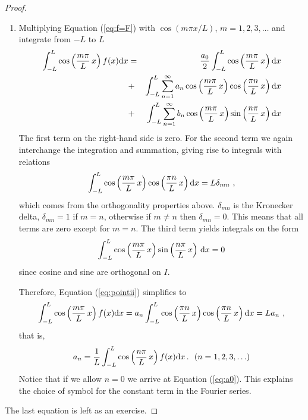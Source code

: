 \begin{proof}
\begin{enumerate}
	\item  Multiplying Equation (\ref{eq:f=F}) with $\cos(m \pi x/L)$, $m=1,2,3, \ldots$ and integrate from $-L$ to $L$
		\begin{eqnarray}
			\int_{-L}^{L}\cos\left(\frac{m\pi }{L} \, x\right) f(x)\mathrm{d} x &=&
				 \frac{a_0}{2} \int_{-L}^L \cos\left(\frac{m\pi }{L} \, x\right) \mathrm{d} x 
				 \nonumber \\
				 &+& \int_{-L}^L \sum_{n=1}^\infty a_n\cos\left(\frac{m\pi }{L} \, x\right) 
				 \cos\left(\frac{\pi n}{L} \, x\right) \mathrm{d} x 
				\nonumber \\
				&+& \int_{-L}^L \sum_{n=1}^\infty b_n \cos\left(\frac{m\pi }{L} \, x\right)   \sin\left(\frac{n\pi }{L} 
				\, x\right) \mathrm{d} x 
				\nonumber \\
			\label{eq:pointii}
		\end{eqnarray}
		The first term on the right-hand side is zero. For the second term 	we again interchange 
		the integration and summation, giving rise to integrals with relations
		\begin{eqnarray}
			\int_{-L}^L \cos\left(\frac{m\pi }{L} \, x\right) \cos\left(\frac{\pi n}{L} \, 
			x\right) \mathrm{d} x = L \delta_{mn} \ ,
		\end{eqnarray}
		which comes from the orthogonality properties above. $\delta_{mn}$ is the Kronecker delta, 
		$\delta_{mn}=1$ if $m=n$, otherwise if $m \neq n$ then $\delta_{mn}
		= 0$. This means that all terms are zero except for $m=n$. The third term 
		yields integrals on the form
		\begin{eqnarray}
			\int_{-L}^L \cos\left(\frac{m\pi }{L} \, x\right)
			\sin\left(\frac{n\pi }{L}	\, x\right) \, \mathrm{d} x = 0 
		\end{eqnarray}
		since cosine and sine are orthogonal on $I$. 

		Therefore, Equation (\ref{eq:pointii}) simplifies to
		\begin{equation}
			\int_{-L}^{L}\cos\left(\frac{m\pi }{L} \, x\right) f(x)\mathrm{d} x  = a_n \int_{-L}^L  
			\cos\left(\frac{\pi n}{L} \, x\right) \cos\left(\frac{\pi n}{L} \, x\right) \mathrm{d} x = L a_n \ , 
		\end{equation}
		that is,
		\begin{equation}
			\label{eq:an}
			a_n = \frac{1}{L} \int_{-L}^L \cos\left(\frac{n\pi }{L} \, x\right)
			f(x)\mathrm{d} x \, . 				\ \ (n=1,2,3, \ldots)
		\end{equation}
		Notice that if we allow $n=0$ we arrive at Equation (\ref{eq:a0}). This explains the choice 
		of symbol for the constant term in the Fourier series.
	\end{enumerate}
	The last equation is left as an exercise.
\end{proof}

